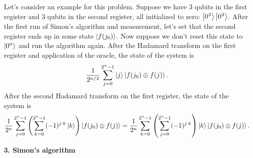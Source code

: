 \documentclass{article}
\theoremstyle{definition}
\newcommand{\f}[2]{\frac{#1}{#2}}
\newcommand{\lp}{\left(}
\newcommand{\rp}{\right)}
\begin{document}
\noindent Let's consider an example for this problem. Suppose we have 3 qubits in the first register and 3 qubits in the second register, all initialized to zero: $\ket{0^3} \ket{0^3}$. After the first run of Simon's algorithm and measurement, let's set that the second register ends up in some state $\ket{f(j_0)}$. Now suppose we don't reset this state to $\ket{0^n}$ and run the algorithm again. After the Hadamard transform on the first register and application of the oracle, the state of the system is 
\begin{align*}
\f{1}{2^{n/2}} \sum_{j=0}^{2^n-1}\ket{j} \ket{f(j_0)\oplus f(j)}.  
\end{align*}
After the second Hadamard transform on the first register, the state of the system is 
\begin{align*}
\f{1}{2^{n}} \sum_{j=0}^{2^n-1}\lp     \sum_{k=0}^{2^n-1} (-1)^{j\cdot k} \ket{k} \rp \ket{f(j_0)\oplus f(j)} = \f{1}{2^n}  \sum_{k=0}^{2^n-1} \lp \sum_{j=0}^{2^n-1} (-1)^{j\cdot k} \rp \ket{k} \ket{     f(j_0) \oplus f(j)  }. 
\end{align*}




\noindent \textbf{3. Simon's algorithm}
\end{document}
